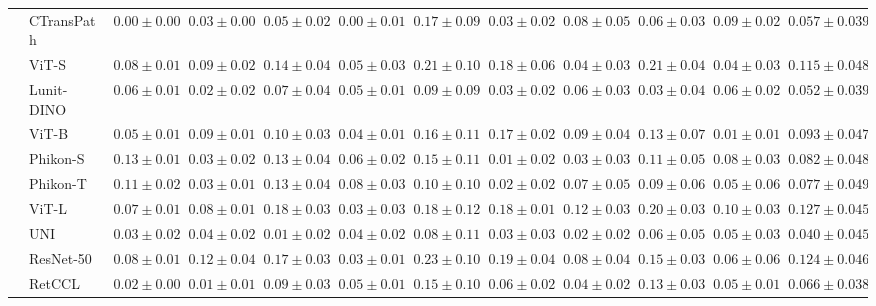 \begin{tabular}{ll|cccc|c|cccc|c}
 & CTransPath~\cite{wang2022transformer} & $\mathbf{0.00 \pm 0.00}$ & $0.03 \pm 0.00$ & $0.05 \pm 0.02$ & $\mathbf{0.00 \pm 0.01}$ & $0.17 \pm 0.09$ & $0.03 \pm 0.02$ & $0.08 \pm 0.05$ & $0.06 \pm 0.03$ & $0.09 \pm 0.02$ & $0.057 \pm 0.039$ \\
 & ViT-S~\cite{kolesnikov2021image} & $0.08 \pm 0.01$ & $0.09 \pm 0.02$ & $0.14 \pm 0.04$ & $0.05 \pm 0.03$ & $0.21 \pm 0.10$ & $0.18 \pm 0.06$ & $0.04 \pm 0.03$ & $0.21 \pm 0.04$ & $0.04 \pm 0.03$ & $0.115 \pm 0.048$ \\
 & Lunit-DINO~\cite{kang2023benchmarking} & $0.06 \pm 0.01$ & $0.02 \pm 0.02$ & $0.07 \pm 0.04$ & $0.05 \pm 0.01$ & $0.09 \pm 0.09$ & $0.03 \pm 0.02$ & $0.06 \pm 0.03$ & $0.03 \pm 0.04$ & $0.06 \pm 0.02$ & $0.052 \pm 0.039$ \\
 & ViT-B~\cite{kolesnikov2021image} & $0.05 \pm 0.01$ & $0.09 \pm 0.01$ & $0.10 \pm 0.03$ & $0.04 \pm 0.01$ & $0.16 \pm 0.11$ & $0.17 \pm 0.02$ & $0.09 \pm 0.04$ & $0.13 \pm 0.07$ & $\mathbf{0.01 \pm 0.01}$ & $0.093 \pm 0.047$ \\
 & Phikon-S~\cite{filiot2023scaling} & $0.13 \pm 0.01$ & $0.03 \pm 0.02$ & $0.13 \pm 0.04$ & $0.06 \pm 0.02$ & $0.15 \pm 0.11$ & $\mathbf{0.01 \pm 0.02}$ & $0.03 \pm 0.03$ & $0.11 \pm 0.05$ & $0.08 \pm 0.03$ & $0.082 \pm 0.048$ \\
 & Phikon-T~\cite{filiot2023scaling} & $0.11 \pm 0.02$ & $0.03 \pm 0.01$ & $0.13 \pm 0.04$ & $0.08 \pm 0.03$ & $0.10 \pm 0.10$ & $0.02 \pm 0.02$ & $0.07 \pm 0.05$ & $0.09 \pm 0.06$ & $0.05 \pm 0.06$ & $0.077 \pm 0.049$ \\
 & ViT-L~\cite{kolesnikov2021image} & $0.07 \pm 0.01$ & $0.08 \pm 0.01$ & $0.18 \pm 0.03$ & $0.03 \pm 0.03$ & $0.18 \pm 0.12$ & $0.18 \pm 0.01$ & $0.12 \pm 0.03$ & $0.20 \pm 0.03$ & $0.10 \pm 0.03$ & $0.127 \pm 0.045$ \\
 & UNI~\cite{chen2024uni} & $0.03 \pm 0.02$ & $0.04 \pm 0.02$ & $\mathbf{0.01 \pm 0.02}$ & $0.04 \pm 0.02$ & $\mathbf{0.08 \pm 0.11}$ & $0.03 \pm 0.03$ & $\mathbf{0.02 \pm 0.02}$ & $0.06 \pm 0.05$ & $0.05 \pm 0.03$ & $\mathbf{0.040 \pm 0.045}$ \\
 & ResNet-50~\cite{he2015deep} & $0.08 \pm 0.01$ & $0.12 \pm 0.04$ & $0.17 \pm 0.03$ & $0.03 \pm 0.01$ & $0.23 \pm 0.10$ & $0.19 \pm 0.04$ & $0.08 \pm 0.04$ & $0.15 \pm 0.03$ & $0.06 \pm 0.06$ & $0.124 \pm 0.046$ \\
 & RetCCL~\cite{wang2023retccl} & $0.02 \pm 0.00$ & $0.01 \pm 0.01$ & $0.09 \pm 0.03$ & $0.05 \pm 0.01$ & $0.15 \pm 0.10$ & $0.06 \pm 0.02$ & $0.04 \pm 0.02$ & $0.13 \pm 0.03$ & $0.05 \pm 0.01$ & $0.066 \pm 0.038$ \\

\end{tabular}
